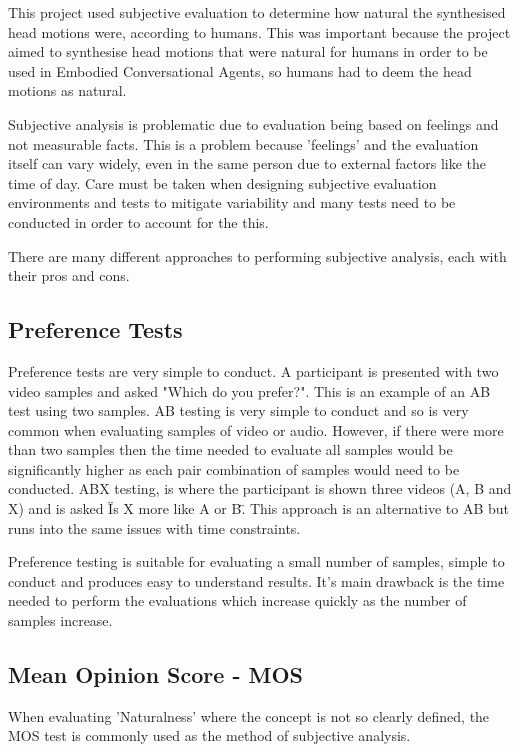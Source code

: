 \documentclass[bsc,frontabs,twoside,singlespacing,parskip]{infthesis}
\begin{document}
This project used subjective evaluation to determine how natural the synthesised head motions were, according to humans. This was important because the project aimed to synthesise head motions that were natural for humans in order to be used in Embodied Conversational Agents, so humans had to deem the head motions as natural.

Subjective analysis is problematic due to evaluation being based on feelings and not measurable facts. This is a problem because 'feelings' and the evaluation itself can vary widely, even in the same person due to external factors like the time of day. Care must be taken when designing subjective evaluation environments and tests to mitigate variability and many tests need to be conducted in order to account for the this. 

There are many different approaches to performing subjective analysis, each with their pros and cons. 

\subsection{Preference Tests}

Preference tests are very simple to conduct. A participant is presented with two video samples and asked "Which do you prefer?". This is an example of an AB test using two samples. AB testing is very simple to conduct and so is very common when evaluating samples of video or audio. However, if there were more than two samples then the time needed to evaluate all samples would be significantly higher as each pair combination of samples would need to be conducted. ABX testing, \cite{abx_testing} is where the participant is shown three videos (A, B and X) and is asked \"Is X more like A or B\". This approach is an alternative to AB but runs into the same issues with time constraints.

Preference testing is suitable for evaluating a small number of samples, simple to conduct and produces easy to understand results. It's main drawback is the time needed to perform the evaluations which increase quickly as the number of samples increase.

\subsection{Mean Opinion Score - MOS}

When evaluating 'Naturalness' where the concept is not so clearly defined, the MOS test is commonly used as the method of subjective analysis. \cite{mos}
\end{document}
